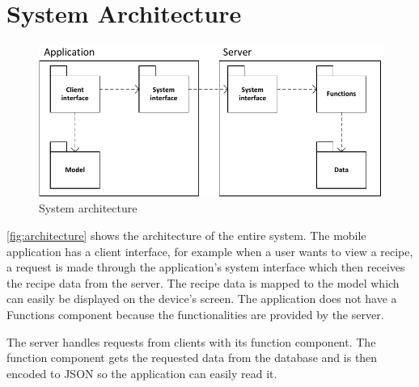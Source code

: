 \section{System Architecture}

\begin{figure}[H]
\centering
\includegraphics[width=0.9\linewidth]{img/components.pdf}
\caption{System architecture}
\label{fig:architecture}
\end{figure}

\autoref{fig:architecture} shows the architecture of the entire system. The mobile application has a client interface, for example when a user wants to view a recipe, a request is made through the application's system interface which then receives the recipe data from the server. The recipe data is mapped to the model which can easily be displayed on the device's screen. The application does not have a Functions component because the functionalities are provided by the server.

The server handles requests from clients with its function component. The function component gets the requested data from the database and is then encoded to JSON so the application can easily read it.